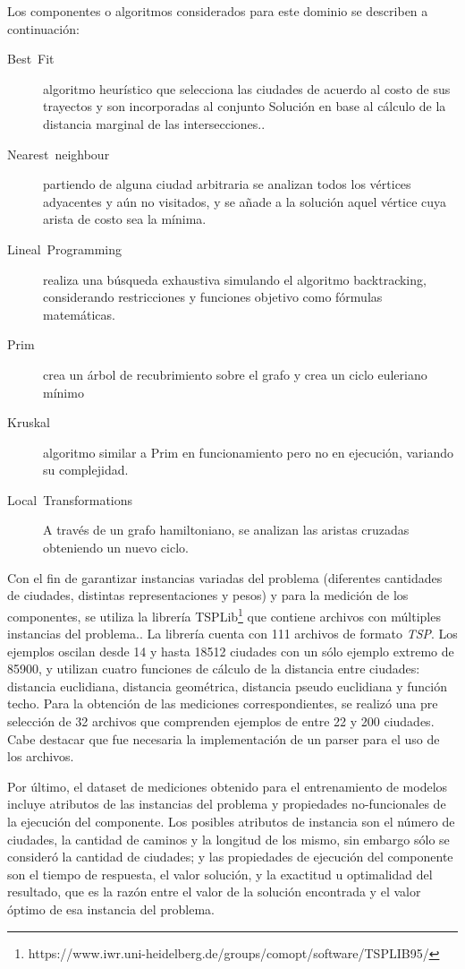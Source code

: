 Los componentes o algoritmos considerados para este dominio se describen
a continuación: 
\begin{description}
\item [{Best~Fit}] algoritmo heurístico que selecciona las ciudades de
acuerdo al costo de sus trayectos y son incorporadas al conjunto Solución
en base al cálculo de la distancia marginal de las intersecciones.. 
\item [{Nearest~neighbour}] partiendo de alguna ciudad arbitraria se analizan
todos los vértices adyacentes y aún no visitados, y se añade a la
solución aquel vértice cuya arista de costo sea la mínima. 
\item [{Lineal~Programming}] realiza una búsqueda exhaustiva simulando
el algoritmo backtracking, considerando restricciones y funciones
objetivo como fórmulas matemáticas. 
\item [{Prim}] crea un árbol de recubrimiento sobre el grafo y crea un
ciclo euleriano mínimo
\item [{Kruskal}] algoritmo similar a Prim en funcionamiento pero no en
ejecución, variando su complejidad.
\item [{Local~Transformations}] A través de un grafo hamiltoniano, se
analizan las aristas cruzadas obteniendo un nuevo ciclo.
\end{description}
Con el fin de garantizar instancias variadas del problema (diferentes
cantidades de ciudades, distintas representaciones y pesos) y para
la medición de los componentes, se utiliza la librería TSPLib\footnote{https://www.iwr.uni-heidelberg.de/groups/comopt/software/TSPLIB95/}
que contiene archivos con múltiples instancias del problema.. La librería
cuenta con 111 archivos de formato \emph{TSP}. Los ejemplos oscilan
desde 14 y hasta 18512 ciudades con un sólo ejemplo extremo de 85900,
y utilizan cuatro funciones de cálculo de la distancia entre ciudades:
distancia euclidiana, distancia geométrica, distancia pseudo euclidiana
y función techo. Para la obtención de las mediciones correspondientes,
se realizó una pre selección de 32 archivos que comprenden ejemplos
de entre 22 y 200 ciudades. Cabe destacar que fue necesaria la implementación
de un parser para el uso de los archivos. 

Por último, el dataset de mediciones obtenido para el entrenamiento
de modelos incluye atributos de las instancias del problema y propiedades
no-funcionales de la ejecución del componente. Los posibles atributos
de instancia son el número de ciudades, la cantidad de caminos y la
longitud de los mismo, sin embargo sólo se consideró la cantidad de
ciudades; y las propiedades de ejecución del componente son el tiempo
de respuesta, el valor solución, y la exactitud u optimalidad del
resultado, que es la razón entre el valor de la solución encontrada
y el valor óptimo de esa instancia del problema. 

